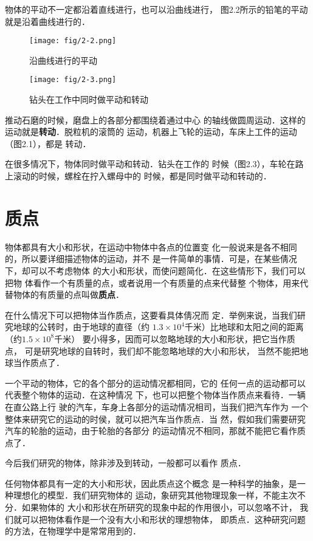     物体的平动不一定都沿着直线进行，也可以沿曲线进行，
图2.2所示的铅笔的平动就是沿着曲线进行的．
\begin{figure}[htp]
\centering
\begin{minipage}[t]{0.48\textwidth}
\centering
\texttt{[image: fig/2-2.png]}
\caption{沿曲线进行的平动}
\end{minipage}
\begin{minipage}[t]{0.48\textwidth}
\centering
\texttt{[image: fig/2-3.png]}
\caption{钻头在工作中同时做平动和转动}
\end{minipage}
\end{figure}
    推动石磨的时候，磨盘上的各部分都围绕着通过中心
的轴线做圆周运动．这样的运动就是\textbf{转动}．脱粒机的滚筒的
运动，机器上飞轮的运动，车床上工件的运动（图2.1），都是
转动．


    在很多情况下，物体同时做平动和转动．钻头在工作的
时候（图2.3），车轮在路上滚动的时候，螺栓在拧入螺母中的
时候，都是同时做平动和转动的．

\section{质点}
    物体都具有大小和形状，在运动中物体中各点的位置变
化一般说来是各不相同的，所以要详细描述物体的运动，并不
是一件简单的事情．可是，在某些倩况下，却可以不考虑物体
的大小和形状，而使问题简化．在这些情形下，我们可以把物
体看作一个有质量的点，或者说用一个有质量的点来代替整
个物体，用来代替物体的有质量的点叫做\textbf{质点}．

    在什么情况下可以把物体当作质点，这要看具体倩况而
定．举例来说，当我们研究地球的公转时，由于地球的直径（约
$1.3\times 10^4$千米）比地球和太阳之间的距离（约$1.5\times 10^8$千米）
要小得多，因而可以忽略地球的大小和形状，把它当作质点，
可是研究地球的自转时，我们却不能忽略地球的大小和形状，
当然不能把地球当作质点了．

    一个平动的物体，它的各个部分的运动情况都相同，它的
任何一点的运动都可以代表整个物体的运动．在这种情况
下，也可以把整个物体当作质点来看待．一辆在直公路上行
驶的汽车，车身上各部分的运动情况相司，当我们把汽车作为
一个整体来研究它的运动的时侯，就可以把汽车当作质点．当
然，假如我们需要研究汽车的轮胎的运动，由于轮胎的各部分
的运动情况不相同，那就不能把它看作质点了．

    今后我们研究的物体，除非涉及到转动，一般都可以看作
质点．

    任何物体都具有一定的大小和形状，因此质点这个概念
是一种科学的抽象，是一种理想化的模型．我们研究物体的
运动，象研究其他物理现象一样，不能主次不分．如果物体的
大小和形状在所研究的现象中起的作用很小，可以忽咯不计，
我们就可以把物体看作是一个没有大小和形状的理想物体，
即质点．这种研究问题的方法，在物理学中是常常用到的．

